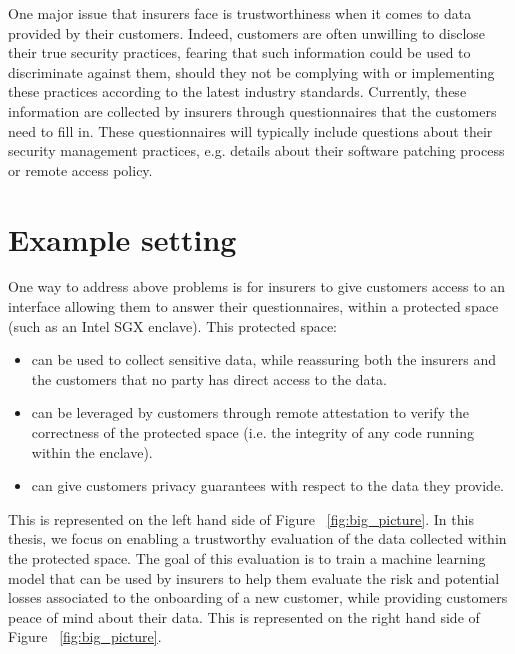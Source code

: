 One major issue that insurers face is trustworthiness when it comes to data provided by their customers. Indeed, customers are often unwilling to disclose their true security practices, fearing that such information could be used to discriminate against them, should they not be complying with or implementing these practices according to the latest industry standards. Currently, these information are collected by insurers through questionnaires that the customers need to fill in. These questionnaires will typically include questions about their security management practices, e.g. details about their software patching process or remote access policy.

\section{Example setting}

One way to address above problems is for insurers to give customers access to an interface allowing them to answer their questionnaires, within a protected space (such as an Intel SGX enclave). This protected space:

\begin{itemize}
	\item can be used to collect sensitive data, while reassuring both the insurers and the customers that no party has direct access to the data.
	\item can be leveraged by customers through remote attestation to verify the correctness of the protected space (i.e. the integrity of any code running within the enclave).
	\item can give customers privacy guarantees with respect to the data they provide.
\end{itemize}

This is represented on the left hand side of Figure ~\ref{fig:big_picture}. In this thesis, we focus on enabling a trustworthy evaluation of the data collected within the protected space. The goal of this evaluation is to train a machine learning model that can be used by insurers to help them evaluate the risk and potential losses associated to the onboarding of a new customer, while providing customers peace of mind about their data. This is represented on the right hand side of Figure ~\ref{fig:big_picture}.

